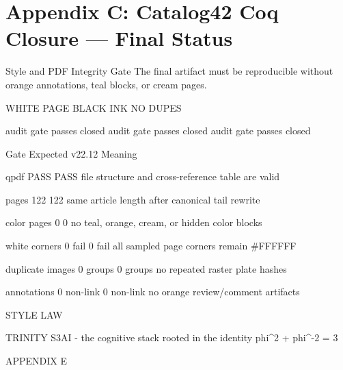 
\section{Appendix C: Catalog42 Coq Closure --- Final Status}

Style and PDF Integrity Gate
        The final artifact must be reproducible without orange annotations, teal blocks, or cream
                                                  pages.

                      WHITE PAGE                              BLACK INK                                  NO DUPES

                 audit gate passes closed                  audit gate passes closed                 audit gate passes closed

               Gate                          Expected                      v22.12                                 Meaning

 qpdf                               PASS                        PASS                        file structure and cross-reference table are valid

 pages                              122                         122                         same article length after canonical tail rewrite

 color pages                        0                           0                           no teal, orange, cream, or hidden color blocks

 white corners                      0 fail                      0 fail                      all sampled page corners remain \#FFFFFF

 duplicate images                   0 groups                    0 groups                    no repeated raster plate hashes

 annotations                        0 non-link                  0 non-link                  no orange review/comment artifacts

  STYLE LAW

                                TRINITY S3AI - the cognitive stack rooted in the identity phi^2 + phi^-2 = 3

                                                                     APPENDIX E